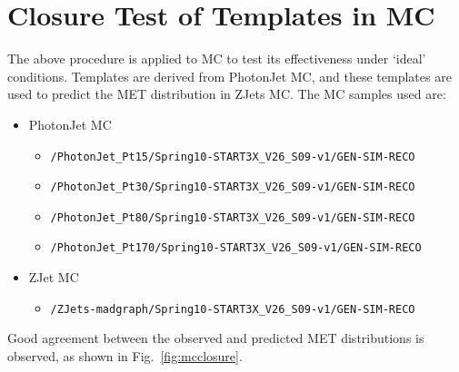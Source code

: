 
\section{Closure Test of Templates in MC}
\label{sec:mc}

The above procedure is applied to MC to test its effectiveness under `ideal' conditions. Templates are derived from PhotonJet MC, 
and these templates are used to predict the MET distribution in ZJets MC. The MC samples used are:
\begin{itemize}
\item PhotonJet MC
  \begin{itemize}
  \item \verb=/PhotonJet_Pt15/Spring10-START3X_V26_S09-v1/GEN-SIM-RECO=
  \item \verb=/PhotonJet_Pt30/Spring10-START3X_V26_S09-v1/GEN-SIM-RECO=
  \item \verb=/PhotonJet_Pt80/Spring10-START3X_V26_S09-v1/GEN-SIM-RECO=
  \item \verb=/PhotonJet_Pt170/Spring10-START3X_V26_S09-v1/GEN-SIM-RECO=
  \end{itemize}
\item ZJet MC
  \begin{itemize}
  \item \verb=/ZJets-madgraph/Spring10-START3X_V26_S09-v1/GEN-SIM-RECO=
  \end{itemize}
\end{itemize}

Good agreement between the observed and predicted MET distributions is observed, as shown in Fig.~\ref{fig:mcclosure}.

